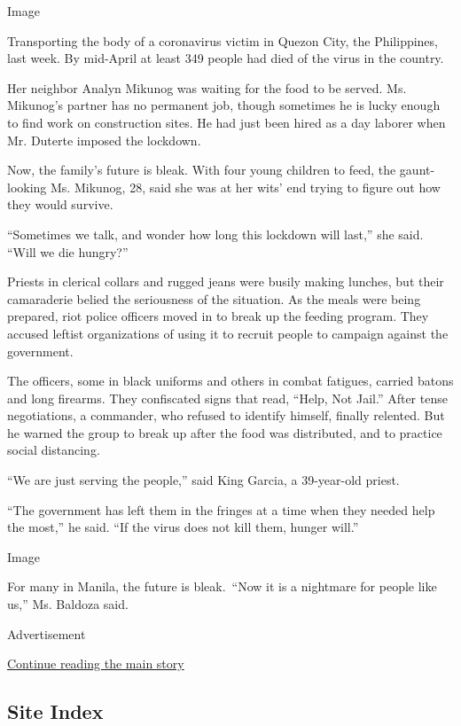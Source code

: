 Image

Transporting the body of a coronavirus victim in Quezon City, the
Philippines, last week. By mid-April at least 349 people had died of the
virus in the country.

Her neighbor Analyn Mikunog was waiting for the food to be served. Ms.
Mikunog's partner has no permanent job, though sometimes he is lucky
enough to find work on construction sites. He had just been hired as a
day laborer when Mr. Duterte imposed the lockdown.

Now, the family's future is bleak. With four young children to feed, the
gaunt-looking Ms. Mikunog, 28, said she was at her wits' end trying to
figure out how they would survive.

``Sometimes we talk, and wonder how long this lockdown will last,'' she
said. ``Will we die hungry?''

Priests in clerical collars and rugged jeans were busily making lunches,
but their camaraderie belied the seriousness of the situation. As the
meals were being prepared, riot police officers moved in to break up the
feeding program. They accused leftist organizations of using it to
recruit people to campaign against the government.

The officers, some in black uniforms and others in combat fatigues,
carried batons and long firearms. They confiscated signs that read,
``Help, Not Jail.'' After tense negotiations, a commander, who refused
to identify himself, finally relented. But he warned the group to break
up after the food was distributed, and to practice social distancing.

``We are just serving the people,'' said King Garcia, a 39-year-old
priest.

``The government has left them in the fringes at a time when they needed
help the most,'' he said. ``If the virus does not kill them, hunger
will.''

Image

For many in Manila, the future is bleak.~``Now it is a nightmare for
people like us,'' Ms. Baldoza said.

Advertisement

\protect\hyperlink{after-bottom}{Continue reading the main story}

\hypertarget{site-index}{%
\subsection{Site Index}\label{site-index}}

